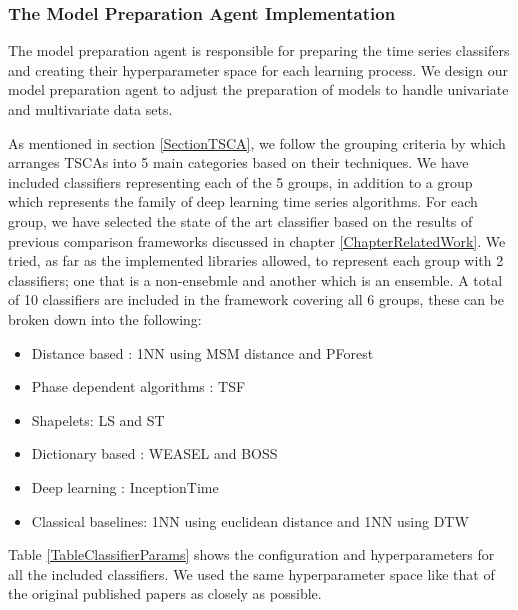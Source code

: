 \subsubsection*{The Model Preparation Agent Implementation}
\label{ModelPreparationAgentImplementation}
The model preparation agent is responsible for preparing the time series classifers and creating their hyperparameter space for each learning process.
We design our model preparation agent to adjust the preparation of models to handle univariate and multivariate data sets.

As mentioned in section \ref{SectionTSCA}, we follow the grouping criteria by \cite{bagnall2017great} which arranges TSCAs into 5 main categories based on their techniques.
We have included classifiers representing each of the 5 groups, in addition to a  group which represents the family of deep learning time series algorithms.
For each group, we have selected the state of the art classifier based on the results of previous comparison frameworks discussed in chapter \ref{ChapterRelatedWork}.
We tried, as far as the implemented libraries allowed, to represent each group with 2 classifiers; one that is a non-ensebmle and another which is an ensemble.
A total of 10 classifiers are included in the framework covering all 6 groups, these can be broken down into the following:
\begin{itemize}
  \item Distance based : 1NN using MSM distance and PForest
  \item Phase dependent algorithms : TSF
  \item Shapelets: LS and ST
  \item Dictionary based : WEASEL and BOSS
  \item Deep learning : InceptionTime
  \item Classical baselines: 1NN using euclidean distance and 1NN using DTW
\end{itemize}

Table \ref{TableClassifierParams} shows the configuration and hyperparameters for all the included classifiers.
We used the same hyperparameter space like that of the original published papers as closely as possible.

